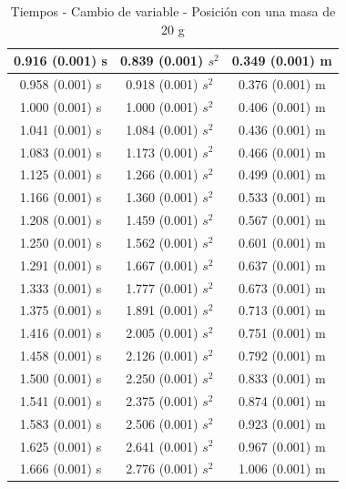 \documentclass[12pt,a4paper]{article}
\begin{document}
\begin{table}[h!]
\begin{center}
\begin{tabular}{|c|c|c|}
0.916 (0.001) s & 0.839 (0.001) $s^2$ & 0.349 (0.001) m \\ \hline
0.958 (0.001) s & 0.918 (0.001) $s^2$ & 0.376 (0.001) m \\ \hline
1.000 (0.001) s & 1.000 (0.001) $s^2$ & 0.406 (0.001) m \\ \hline
1.041 (0.001) s & 1.084 (0.001) $s^2$ & 0.436 (0.001) m \\ \hline
1.083 (0.001) s & 1.173 (0.001) $s^2$ & 0.466 (0.001) m \\ \hline
1.125 (0.001) s & 1.266 (0.001) $s^2$ & 0.499 (0.001) m \\ \hline
1.166 (0.001) s & 1.360 (0.001) $s^2$ & 0.533 (0.001) m \\ \hline
1.208 (0.001) s & 1.459 (0.001) $s^2$ & 0.567 (0.001) m \\ \hline
1.250 (0.001) s & 1.562 (0.001) $s^2$ & 0.601 (0.001) m \\ \hline
1.291 (0.001) s & 1.667 (0.001) $s^2$ & 0.637 (0.001) m \\ \hline
1.333 (0.001) s & 1.777 (0.001) $s^2$ & 0.673 (0.001) m \\ \hline
1.375 (0.001) s & 1.891 (0.001) $s^2$ & 0.713 (0.001) m \\ \hline
1.416 (0.001) s & 2.005 (0.001) $s^2$ & 0.751 (0.001) m \\ \hline
1.458 (0.001) s & 2.126 (0.001) $s^2$ & 0.792 (0.001) m \\ \hline
1.500 (0.001) s & 2.250 (0.001) $s^2$ & 0.833 (0.001) m \\ \hline
1.541 (0.001) s & 2.375 (0.001) $s^2$ & 0.874 (0.001) m \\ \hline
1.583 (0.001) s & 2.506 (0.001) $s^2$ & 0.923 (0.001) m \\ \hline
1.625 (0.001) s & 2.641 (0.001) $s^2$ & 0.967 (0.001) m \\ \hline
1.666 (0.001) s & 2.776 (0.001) $s^2$ & 1.006 (0.001) m \\ \hline

\end{tabular}
\caption{Tiempos - Cambio de variable - Posición con una masa de 20 g}
\end{center}
\end{table}
\end{document}
